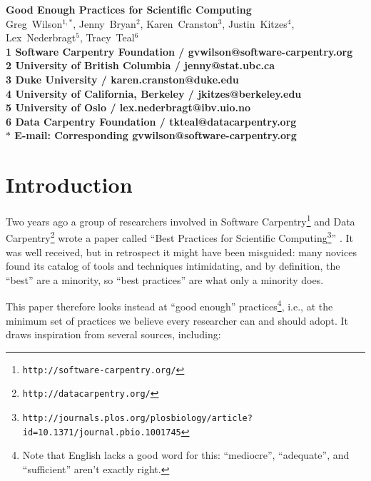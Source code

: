 \documentclass[10pt]{article}
\date{}
\newcommand{\withurl}[2]{{#1}\footnote{\texttt{#2}}}
\begin{document}
\begin{flushleft}
{\Large
\textbf{Good Enough Practices for Scientific Computing}
}
\\
{Greg~Wilson}$^{1,\ast}$,
{Jenny~Bryan}$^{2}$,
{Karen~Cranston}$^{3}$,
{Justin~Kitzes}$^{4}$,
{Lex~Nederbragt}$^{5}$,
{Tracy~Teal}$^{6}$
\\
\bf{1} Software Carpentry Foundation / gvwilson@software-carpentry.org
\\
\bf{2} University of British Columbia / jenny@stat.ubc.ca
\\
\bf{3} Duke University / karen.cranston@duke.edu
\\
\bf{4} University of California, Berkeley / jkitzes@berkeley.edu
\\
\bf{5} University of Oslo / lex.nederbragt@ibv.uio.no
\\
\bf{6} Data Carpentry Foundation / tkteal@datacarpentry.org
\\
$\ast$ E-mail: Corresponding gvwilson@software-carpentry.org
\end{flushleft}

\section{Introduction}\label{introduction}

Two years ago a group of researchers involved in \withurl{Software
  Carpentry}{http://software-carpentry.org/} and \withurl{Data
  Carpentry}{http://datacarpentry.org/} wrote a paper called
``\withurl{Best Practices for Scientific
  Computing}{http://journals.plos.org/plosbiology/article?id=10.1371/journal.pbio.1001745}''
\cite{wilson2014}. It was well received, but in retrospect it might
have been misguided: many novices found its catalog of tools and
techniques intimidating, and by definition, the ``best'' are a
minority, so ``best practices'' are what only a minority does.

This paper therefore looks instead at ``good enough''
practices\footnote{Note that English lacks a good word for this:
  ``mediocre'', ``adequate'', and ``sufficient'' aren't exactly
  right.}, i.e., at the minimum set of practices we believe every
researcher can and should adopt. It draws inspiration from several
sources, including:
\end{document}
